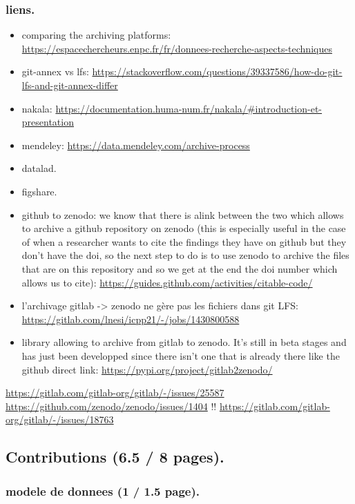 \documentclass[11pt]{article}
\begin{document}
\subsubsection{liens.}
\label{sec:org8c97820}
\begin{itemize}
\item comparing the archiving platforms: \url{https://espacechercheurs.enpc.fr/fr/donnees-recherche-aspects-techniques}
\item git-annex vs lfs: \url{https://stackoverflow.com/questions/39337586/how-do-git-lfs-and-git-annex-differ}
\item nakala: \url{https://documentation.huma-num.fr/nakala/\#introduction-et-presentation}
\item mendeley: \url{https://data.mendeley.com/archive-process}
\item datalad.
\item figshare.
\item github to zenodo: we know that there is alink between the two which allows to archive a github repository on zenodo (this is especially useful in the case of  when a researcher wants to cite the findings they have on github but they don't have the doi, so the next step to do is to use zenodo to archive the files that are on this repository and so we get at the end the doi number which allows us to cite): \url{https://guides.github.com/activities/citable-code/}
\item l'archivage gitlab -> zenodo ne gère pas les fichiers dans git LFS: \url{https://gitlab.com/lnesi/icpp21/-/jobs/1430800588}
\item library allowing to archive from gitlab to zenodo. It's still in beta stages and has just been developped since there isn't one that is already there like the github direct link: \url{https://pypi.org/project/gitlab2zenodo/}
\end{itemize}
\url{https://gitlab.com/gitlab-org/gitlab/-/issues/25587}
\url{https://github.com/zenodo/zenodo/issues/1404} !!
\url{https://gitlab.com/gitlab-org/gitlab/-/issues/18763}
\subsection{Contributions (6.5 / 8 pages).}
\label{sec:orgdaed854}
\subsubsection{modele de donnees (1 / 1.5 page).}
\label{sec:orgb1e2111}
\end{document}
